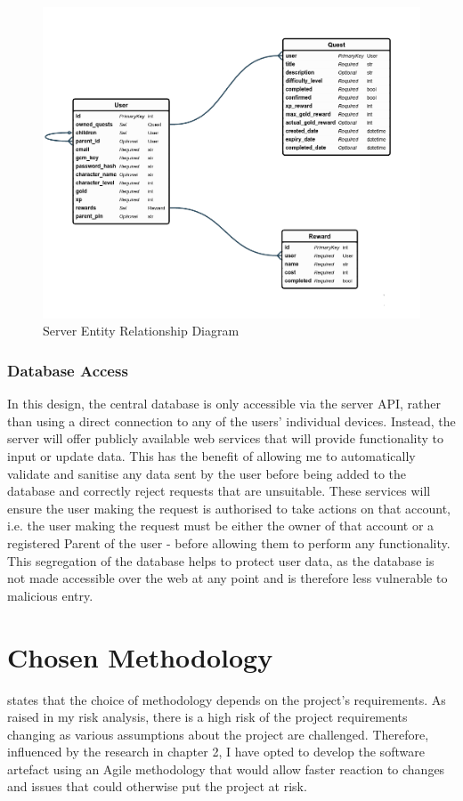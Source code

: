 \begin{figure}[ht]
	\centering
	\includegraphics[scale=0.45]{../images/entityRelationshipDiagram.png}
	\caption{Server Entity Relationship Diagram}
	\label{fig:erd}
\end{figure}

\subsubsection{Database Access}
In this design, the central database is only accessible via the server API, rather than using a direct connection to any of the users' individual devices.
Instead, the server will offer publicly available web services that will provide functionality to input or update data. 
This has the benefit of allowing me to automatically validate and sanitise any data sent by the user before being added to the database and correctly reject requests that are unsuitable.
These services will ensure the user making the request is authorised to take actions on that account, i.e. the user making the request must be either the owner of that account or a registered Parent of the user - before allowing them to perform any functionality.
This segregation of the database helps to protect user data, as the database is not made accessible over the web at any point and is therefore less vulnerable to malicious entry.

\section{Chosen Methodology}
\cite{balaji2012waterfall} states that the choice of methodology depends on the project's requirements.
As raised in my risk analysis, there is a high risk of the project requirements changing as various assumptions about the project are challenged.
Therefore, influenced by the research in chapter 2, I have opted to develop the software artefact using an Agile methodology that would allow faster reaction to changes and issues that could otherwise put the project at risk.

